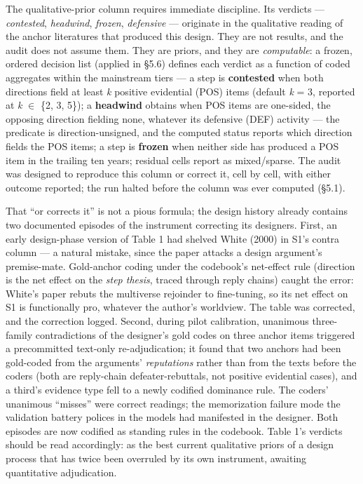 The qualitative-prior column requires immediate discipline. Its verdicts --- \emph{contested}, \emph{headwind}, \emph{frozen}, \emph{defensive} --- originate in the qualitative reading of the anchor literatures that produced this design. They are not results, and the audit does not assume them. They are priors, and they are \emph{computable}: a frozen, ordered decision list (applied in \S{}5.6) defines each verdict as a function of coded aggregates within the mainstream tiers --- a step is \textbf{contested} when both directions field at least \emph{k} positive evidential (POS) items (default \emph{k} = 3, reported at \emph{k} $\in$ \{2, 3, 5\}); a \textbf{headwind} obtains when POS items are one-sided, the opposing direction fielding none, whatever its defensive (DEF) activity --- the predicate is direction-unsigned, and the computed status reports which direction fields the POS items; a step is \textbf{frozen} when neither side has produced a POS item in the trailing ten years; residual cells report as mixed/sparse. The audit was designed to reproduce this column or correct it, cell by cell, with either outcome reported; the run halted before the column was ever computed (\S{}5.1).

That ``or corrects it'' is not a pious formula; the design history already contains two documented episodes of the instrument correcting its designers. First, an early design-phase version of Table 1 had shelved White (2000) in S1's contra column --- a natural mistake, since the paper attacks a design argument's premise-mate. Gold-anchor coding under the codebook's net-effect rule (direction is the net effect on the \emph{step thesis}, traced through reply chains) caught the error: White's paper rebuts the multiverse rejoinder to fine-tuning, so its net effect on S1 is functionally pro, whatever the author's worldview. The table was corrected, and the correction logged. Second, during pilot calibration, unanimous three-family contradictions of the designer's gold codes on three anchor items triggered a precommitted text-only re-adjudication; it found that two anchors had been gold-coded from the arguments' \emph{reputations} rather than from the texts before the coders (both are reply-chain defeater-rebuttals, not positive evidential cases), and a third's evidence type fell to a newly codified dominance rule. The coders' unanimous ``misses'' were correct readings; the memorization failure mode the validation battery polices in the models had manifested in the designer. Both episodes are now codified as standing rules in the codebook. Table 1's verdicts should be read accordingly: as the best current qualitative priors of a design process that has twice been overruled by its own instrument, awaiting quantitative adjudication.

